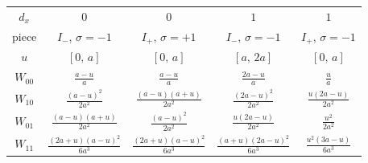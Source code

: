 \begin{tabular}{ccccc}
    \toprule
    $d_x$ & $0$ & $0$ & $1$ & $1$ \\
    piece & $I_{-}$, $\sigma=-1$ & $I_{+}$, $\sigma=+1$ & $I_{-}$, $\sigma=-1$ & $I_{+}$, $\sigma=-1$ \\
    $u$ & $[0,\,a]$ & $[0,\,a]$ & $[a,\,2 a]$ & $[0,\,a]$ \\ \midrule
    $W_{00}$ & $\displaystyle \frac{a - u}{a}$ & $\displaystyle \frac{a - u}{a}$ & $\displaystyle \frac{2 a - u}{a}$ & $\displaystyle \frac{u}{a}$ \\[2ex]
    $W_{10}$ & $\displaystyle \frac{\left(a - u\right)^{2}}{2 a^{2}}$ & $\displaystyle \frac{\left(a - u\right) \left(a + u\right)}{2 a^{2}}$ & $\displaystyle \frac{\left(2 a - u\right)^{2}}{2 a^{2}}$ & $\displaystyle \frac{u \left(2 a - u\right)}{2 a^{2}}$ \\[2ex]
    $W_{01}$ & $\displaystyle \frac{\left(a - u\right) \left(a + u\right)}{2 a^{2}}$ & $\displaystyle \frac{\left(a - u\right)^{2}}{2 a^{2}}$ & $\displaystyle \frac{u \left(2 a - u\right)}{2 a^{2}}$ & $\displaystyle \frac{u^{2}}{2 a^{2}}$ \\[2ex]
    $W_{11}$ & $\displaystyle \frac{\left(2 a + u\right) \left(a - u\right)^{2}}{6 a^{3}}$ & $\displaystyle \frac{\left(2 a + u\right) \left(a - u\right)^{2}}{6 a^{3}}$ & $\displaystyle \frac{\left(a + u\right) \left(2 a - u\right)^{2}}{6 a^{3}}$ & $\displaystyle \frac{u^{2} \left(3 a - u\right)}{6 a^{3}}$ \\[2ex]
    \bottomrule
\end{tabular}
